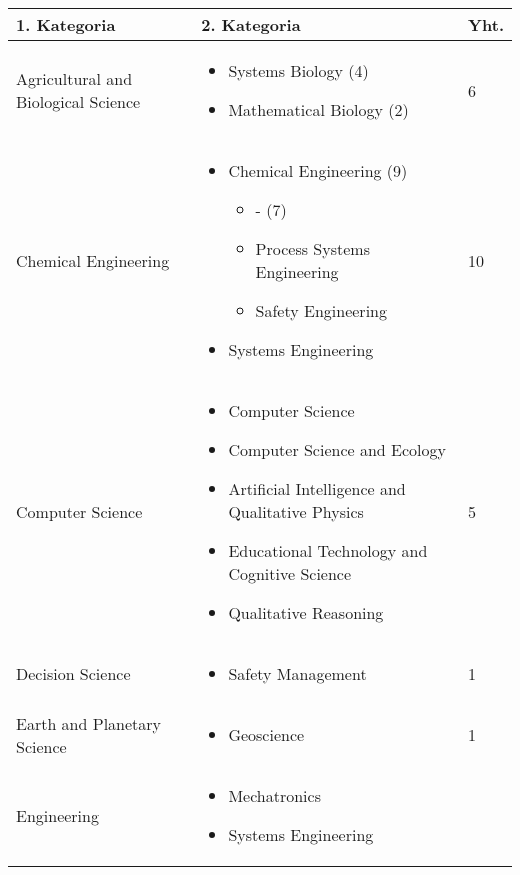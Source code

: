 \documentclass[utf8]{gradu3}
\begin{document}
\begin{longtable}[h]{|p{5cm}|p{8cm}|p{1cm}|}
    \hline
    \textbf{1. Kategoria}    & \textbf{2. Kategoria} & \textbf{Yht.} \\
    \hline
    Agricultural and Biological Science  & \begin{itemize}
        \item Systems Biology (4)
        \item Mathematical Biology (2)
    \end{itemize} & 6 \\
    \hline
    Chemical Engineering & \begin{itemize}
        \item Chemical Engineering (9)
        \begin{itemize}
            \item - (7)
            \item Process Systems Engineering
            \item Safety Engineering
        \end{itemize}
        \item Systems Engineering
    \end{itemize} & 10 \\
    \hline
    Computer Science & \begin{itemize}
        \item Computer Science
        \item Computer Science and Ecology
        \item Artificial Intelligence and Qualitative Physics
        \item Educational Technology and Cognitive Science
        \item Qualitative Reasoning
    \end{itemize} & 5 \\
    \hline
    Decision Science & \begin{itemize}
        \item Safety Management
    \end{itemize} & 1 \\
    \hline
    Earth and Planetary Science & \begin{itemize}
        \item Geoscience
    \end{itemize} & 1 \\
    \hline
    Engineering & \begin{itemize}
        \item Mechatronics
        \item Systems Engineering

\end{itemize}
\end{longtable}
\end{document}
